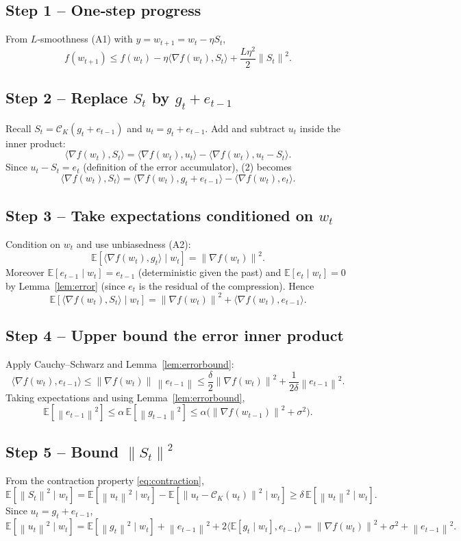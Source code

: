 \documentclass{article}
\newcommand{\E}{\mathbb{E}}
\newcommand{\norm}[1]{\left\lVert#1\right\rVert}
\begin{document}
\subsection*{Step 1 – One‑step progress}
From $L$‑smoothness (A1) with $y=w_{t+1}=w_t-\eta S_t$,
\[
f(w_{t+1})\le f(w_t)-\eta\langle\nabla f(w_t),S_t\rangle
+\frac{L\eta^{2}}{2}\norm{S_t}^{2}. \tag{1}
\]
\subsection*{Step 2 – Replace $S_t$ by $g_t+e_{t-1}$}
Recall $S_t=\mathcal{C}_{K}(g_t+e_{t-1})$ and $u_t=g_t+e_{t-1}$.
Add and subtract $u_t$ inside the inner product:
\[
\langle\nabla f(w_t),S_t\rangle
=\langle\nabla f(w_t),u_t\rangle
-\langle\nabla f(w_t),u_t-S_t\rangle.
\tag{2}
\]
Since $u_t-S_t=e_t$ (definition of the error accumulator), (2) becomes
\[
\langle\nabla f(w_t),S_t\rangle
=\langle\nabla f(w_t),g_t+e_{t-1}\rangle-\langle\nabla f(w_t),e_t\rangle.
\tag{3}
\]

\subsection*{Step 3 – Take expectations conditioned on $w_t$}
Condition on $w_t$ and use unbiasedness (A2):
\[
\E\!\left[\langle\nabla f(w_t),g_t\rangle\mid w_t\right]
= \norm{\nabla f(w_t)}^{2}.
\tag{4}
\]
Moreover $\E[e_{t-1}\mid w_t]=e_{t-1}$ (deterministic given the past) and
$\E[e_t\mid w_t]=0$ by Lemma~\ref{lem:error} (since $e_t$ is the residual of the
compression).  Hence
\[
\E\!\left[\langle\nabla f(w_t),S_t\rangle\mid w_t\right]
= \norm{\nabla f(w_t)}^{2}
+\langle\nabla f(w_t),e_{t-1}\rangle .
\tag{5}
\]

\subsection*{Step 4 – Upper bound the error inner product}
Apply Cauchy–Schwarz and Lemma~\ref{lem:errorbound}:
\[
\langle\nabla f(w_t),e_{t-1}\rangle
\le \norm{\nabla f(w_t)}\,\norm{e_{t-1}}
\le \frac{\delta}{2}\norm{\nabla f(w_t)}^{2}
+\frac{1}{2\delta}\norm{e_{t-1}}^{2}. \tag{6}
\]
Taking expectations and using Lemma~\ref{lem:errorbound},
\[
\E\!\left[\norm{e_{t-1}}^{2}\right]\le\alpha\,\E\!\left[\norm{g_{t-1}}^{2}\right]
\le\alpha\bigl(\norm{\nabla f(w_{t-1})}^{2}+\sigma^{2}\bigr). \tag{7}
\]

\subsection*{Step 5 – Bound $\norm{S_t}^{2}$}
From the contraction property \eqref{eq:contraction},
\[
\E\!\left[\norm{S_t}^{2}\mid w_t\right]
= \E\!\left[\norm{u_t}^{2}\mid w_t\right]
-\E\!\left[\norm{u_t-\mathcal{C}_{K}(u_t)}^{2}\mid w_t\right]
\ge \delta\,\E\!\left[\norm{u_t}^{2}\mid w_t\right]. \tag{8}
\]
Since $u_t=g_t+e_{t-1}$,
\[
\E\!\left[\norm{u_t}^{2}\mid w_t\right]
= \E\!\left[\norm{g_t}^{2}\mid w_t\right]
+ \norm{e_{t-1}}^{2}
+2\langle\E[g_t\mid w_t],e_{t-1}\rangle
= \norm{\nabla f(w_t)}^{2}+\sigma^{2}+\norm{e_{t-1}}^{2}. \tag{9}
\]
\end{document}

